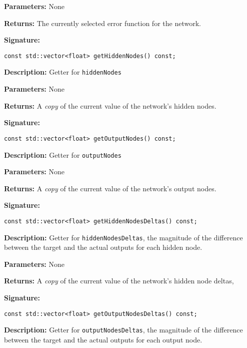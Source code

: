 \documentclass[a4paper]{article}
\begin{document}
\textbf{Parameters: } None

\textbf{Returns: }
The currently selected error function for the network.

\hrulefill %
\newpage
\hrulefill

\textbf{Signature:} \begin{lstlisting}
const std::vector<float> getHiddenNodes() const;
\end{lstlisting}

\textbf{Description: }
Getter for \lstinline{hiddenNodes}

\textbf{Parameters: } None

\textbf{Returns: }
A \textit{copy} of the current value of the network's hidden nodes.
\hrulefill %

\textbf{Signature:} \begin{lstlisting}
const std::vector<float> getOutputNodes() const;
\end{lstlisting}

\textbf{Description: }
Getter for \lstinline{outputNodes}

\textbf{Parameters: } None

\textbf{Returns: }
A \textit{copy} of the current value of the network's output nodes.

\hrulefill %

\textbf{Signature:} \begin{lstlisting}
const std::vector<float> getHiddenNodesDeltas() const;
\end{lstlisting}

\textbf{Description: }
Getter for \lstinline{hiddenNodesDeltas}, the magnitude of the difference between the target and the actual outputs for each hidden node.

\textbf{Parameters: } None

\textbf{Returns: }
A \textit{copy} of the current value of the network's hidden node deltas,

\hrulefill %

\textbf{Signature:} \begin{lstlisting}
const std::vector<float> getOutputNodesDeltas() const;
\end{lstlisting}

\textbf{Description: }
Getter for \lstinline{outputNodesDeltas}, the magnitude of the difference between the target and the actual outputs for each output node.
\end{document}
